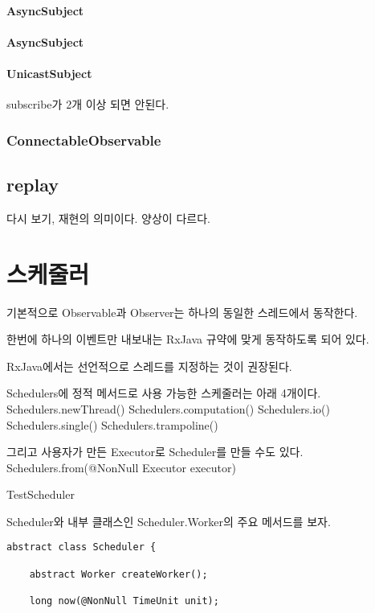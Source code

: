 \documentclass{book}
\begin{document}
{\subsubsection{AsyncSubject}

\subsubsection{AsyncSubject}

\subsubsection{UnicastSubject}
subscribe가 2개 이상 되면 안된다.

\subsection{ConnectableObservable}

\section{replay}
다시 보기, 재현의 의미이다. 양상이 다르다.

\chapter{스케줄러}
기본적으로 Observable과 Observer는 하나의 동일한 스레드에서 동작한다.

한번에 하나의 이벤트만 내보내는 RxJava 규약에 맞게 동작하도록 되어 있다.


RxJava에서는 선언적으로 스레드를 지정하는 것이 권장된다.

Schedulers에 정적 메서드로 사용 가능한 스케줄러는 아래 4개이다.
Schedulers.newThread()
Schedulers.computation()
Schedulers.io()
Schedulers.single()
Schedulers.trampoline()

그리고 사용자가 만든 Executor로 Scheduler를 만들 수도 있다.
Schedulers.from(@NonNull Executor executor)

TestScheduler

Scheduler와 내부 클래스인 Scheduler.Worker의 주요 메서드를 보자.
\begin{verbatim}
abstract class Scheduler {

    abstract Worker createWorker();

    long now(@NonNull TimeUnit unit);


\end{verbatim}}
\end{document}
